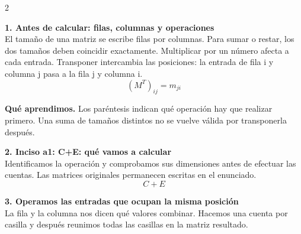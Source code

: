 \documentclass[11pt,a4paper,landscape]{article}
\begin{document}
\begin{multicols*}{2}
\noindent\begin{minipage}{\linewidth}\textbf{1. Antes de calcular: filas, columnas y operaciones}\\[2pt]El tamaño de una matriz se escribe filas por columnas. Para sumar o restar, los dos tamaños deben coincidir exactamente. Multiplicar por un número afecta a cada entrada. Transponer intercambia las posiciones: la entrada de fila i y columna j pasa a la fila j y columna i.
\[(M^T)_{ij}=m_{ji}\]
\par\smallskip\textbf{Qué aprendimos.} Los paréntesis indican qué operación hay que realizar primero. Una suma de tamaños distintos no se vuelve válida por transponerla después.
\end{minipage}\par\medskip
\noindent\begin{minipage}{\linewidth}\textbf{2. Inciso a1: C+E: qué vamos a calcular}\\[2pt]Identificamos la operación y comprobamos sus dimensiones antes de efectuar las cuentas. Las matrices originales permanecen escritas en el enunciado.
\[C+E\]
\end{minipage}\par\medskip
\noindent\begin{minipage}{\linewidth}\textbf{3. Operamos las entradas que ocupan la misma posición}\\[2pt]La fila y la columna nos dicen qué valores combinar. Hacemos una cuenta por casilla y después reunimos todas las casillas en la matriz resultado.
\par{}\par\smallskip

\end{minipage}
\end{multicols*}
\end{document}
